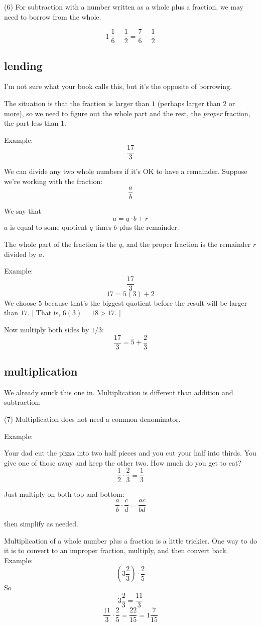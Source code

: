 \documentclass[11pt, oneside]{article}
\begin{document}
(6) For subtraction with a number written as a whole plus a fraction, we may need to borrow from the whole.

\[ 1 \ \frac{1}{6} - \frac{1}{2} = \frac{7}{6} - \frac{1}{2} \]

\subsection*{lending}
I'm not sure what your book calls this, but it's the opposite of borrowing.

The situation is that the fraction is larger than $1$ (perhaps larger than $2$ or more), so we need to figure out the whole part and the rest, the \emph{proper} fraction, the part less than $1$.

Example:
\[ \frac{17}{3} \]

We can divide any two whole numbers if it's OK to have a remainder.  Suppose we're working with the fraction:
\[ \frac{a}{b} \]

We say that
\[ a = q \cdot b + r \]
$a$ is equal to some quotient $q$ times $b$ plus the remainder.  

The whole part of the fraction is the $q$, and the proper fraction is the remainder $r$ divided by $a$.

Example:
\[ \frac{17}{3} \]
\[ 17 = 5(3) + 2 \]
We choose $5$ because that's the biggest quotient before the result will be larger than $17$.  [ That is, $6(3) = 18 > 17$. ]

Now multiply both sides by $1/3$:
\[ \frac{17}{3} = 5 + \frac{2}{3} \]

\subsection*{multiplication}
We already snuck this one in.  Multiplication is different than addition and subtraction:  

(7) Multiplication does not need a common denominator.  

Example:

Your dad cut the pizza into two half pieces and you cut your half into thirds.  You give one of those away and keep the other two.  How much do you get to eat?
\[ \frac{1}{2} \cdot \frac{2}{3} = \frac{1}{3} \]

Just multiply on both top and bottom:
\[  \frac{a}{b} \cdot  \frac{c}{d} =  \frac{ac}{bd} \]

then simplify as needed.

Multiplication of a whole number plus a fraction is a little trickier.  One way to do it is to convert to an improper fraction, multiply, and then convert back.
Example:
\[ (3\frac{2}{3}) \cdot \frac{2}{5} \]
So
\[ 3\frac{2}{3} = \frac{11}{3} \]
\[ \frac{11}{3} \cdot \frac{2}{5} = \frac{22}{15} = 1 \frac{7}{15} \]
\end{document}
